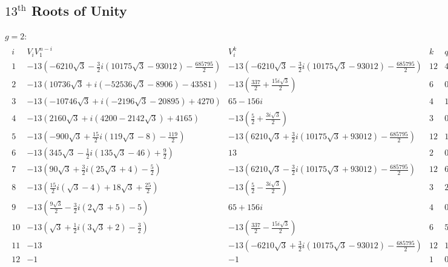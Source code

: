 \documentclass{article}
\renewcommand\({\left(}
\renewcommand\){\right)}
\begin{document}
\begin{landscape}
\subsection{$13^\text{th}$ Roots of Unity}
\vspace{6mm}
$g=2$:
\begin{align*}
    \begin{array}{c|c|c|c|c|c}
        i&V_iV_1^{n-i}&V_i^k&k&q\\
        \hline
        1 & -13 \left(-6210 \sqrt{3}-\frac{3}{2} i \left(10175 \sqrt{3}-93012\right)-\frac{685795}{2}\right) & -13 \left(-6210 \sqrt{3}-\frac{3}{2} i \left(10175 \sqrt{3}-93012\right)-\frac{685795}{2}\right) & 12 & 4 \\
        2 & -13 \left(10736 \sqrt{3}+i \left(-52536 \sqrt{3}-8906\right)-43581\right) & -13 \left(\frac{337}{2}+\frac{15 i \sqrt{3}}{2}\right) & 6 & 0 \\
        3 & -13 \left(-10746 \sqrt{3}+i \left(-2196 \sqrt{3}-20895\right)+4270\right) & 65-156 i & 4 & 1 \\
        4 & -13 \left(2160 \sqrt{3}+i \left(4200-2142 \sqrt{3}\right)+4165\right) & -13 \left(\frac{5}{2}+\frac{3 i \sqrt{3}}{2}\right) & 3 & 0 \\
        5 & -13 \left(-900 \sqrt{3}+\frac{15}{2} i \left(119 \sqrt{3}-8\right)-\frac{119}{2}\right) & -13 \left(6210 \sqrt{3}+\frac{3}{2} i \left(10175 \sqrt{3}+93012\right)-\frac{685795}{2}\right) & 12 & 11 \\
        6 & -13 \left(345 \sqrt{3}-\frac{1}{2} i \left(135 \sqrt{3}-46\right)+\frac{9}{2}\right) & 13 & 2 & 0 \\
        7 & -13 \left(90 \sqrt{3}+\frac{3}{2} i \left(25 \sqrt{3}+4\right)-\frac{5}{2}\right) & -13 \left(6210 \sqrt{3}-\frac{3}{2} i \left(10175 \sqrt{3}+93012\right)-\frac{685795}{2}\right) & 12 & 6 \\
        8 & -13 \left(\frac{15}{2} i \left(\sqrt{3}-4\right)+18 \sqrt{3}+\frac{25}{2}\right) & -13 \left(\frac{5}{2}-\frac{3 i \sqrt{3}}{2}\right) & 3 & 2 \\
        9 & -13 \left(\frac{9 \sqrt{3}}{2}-\frac{3}{2} i \left(2 \sqrt{3}+5\right)-5\right) & 65+156 i & 4 & 0 \\
        10 & -13 \left(\sqrt{3}+\frac{1}{2} i \left(3 \sqrt{3}+2\right)-\frac{3}{2}\right) & -13 \left(\frac{337}{2}-\frac{15 i \sqrt{3}}{2}\right) & 6 & 5 \\
        11 & -13 & -13 \left(-6210 \sqrt{3}+\frac{3}{2} i \left(10175 \sqrt{3}-93012\right)-\frac{685795}{2}\right) & 12 & 1 \\
        12 & -1 & -1 & 1 & 0 \\
    \end{array}
\end{align*}


\end{landscape}
\end{document}
